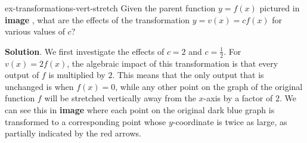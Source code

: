 \documentclass{ximera}
\begin{document}
\begin{example}{}{ex-transformations-vert-stretch}%
Given the parent function \(y = f(x)\) pictured in \textbf{image} , what are the effects of the transformation \(y = v(x) = cf(x)\) for various values of \(c\)?%

\noindent\textbf{Solution}.
We first investigate the effects of \(c = 2\) and \(c = \frac{1}{2}\).  For \(v(x) = 2f(x)\), the algebraic impact of this transformation is that every output of \(f\) is multiplied by \(2\).  This means that the only output that is unchanged is when \(f(x) = 0\), while any other point on the graph of the original function \(f\) will be stretched vertically away from the \(x\)-axis by a factor of \(2\).  We can see this in \textbf{image} where each point on the original dark blue graph is transformed to a corresponding point whose \(y\)-coordinate is twice as large, as partially indicated by the red arrows.%


\end{example}
\end{document}
